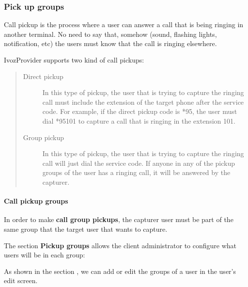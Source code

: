 \documentclass[letterpaper,10pt,spanish]{sphinxmanual}
\begin{document}
\subsubsection{Pick up groups}
\label{administration_portal/client/vpbx/user_configuration/pick_up_groups:capture-groups}\label{administration_portal/client/vpbx/user_configuration/pick_up_groups:pick-up-groups}\label{administration_portal/client/vpbx/user_configuration/pick_up_groups::doc}
Call pickup is the process where a user can answer a call that is being ringing
in another terminal. No need to say that, somehow (sound, flashing lights,
notification, etc) the users must know that the call is ringing elsewhere.

IvozProvider supports two kind of call pickups:
\begin{quote}
\begin{description}
\item[{Direct pickup}] \leavevmode
In this type of pickup, the user that is trying to capture the ringing
call must include the extension of the target phone after the service
code. For example, if the direct pickup code is *95, the user must
dial *95101 to capture a call that is ringing in the extension 101.

\item[{Group pickup}] \leavevmode
In this type of pickup, the user that is trying to capture the ringing
call will just dial the service code. If anyone in any of the pickup
groups of the user has a ringing call, it will be answered by the
capturer.

\end{description}
\end{quote}


\paragraph{Call pickup groups}
\label{administration_portal/client/vpbx/user_configuration/pick_up_groups:call-pickup-groups}
In order to make \textbf{call group pickups}, the capturer user must be part of the
same group that the target user that wants to capture.

The section \textbf{Pickup groups} allows the client administrator to configure
what users will be in each group:

As shown in the section {\hyperref[administration_portal/client/vpbx/users:users]{}}, we can add or edit the groups of a user
in the user's edit screen.
\end{document}
